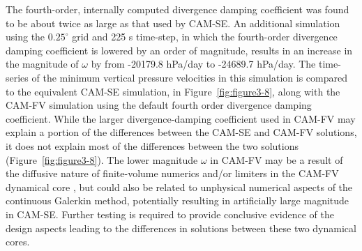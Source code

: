 The fourth-order, internally computed divergence damping coefficient was found to be about twice as large as that used by CAM-SE. An additional simulation using the $0.25^{\circ}$ grid and 225 s time-step, in which the fourth-order divergence damping coefficient is lowered by an order of magnitude, results in an increase in the magnitude of $\omega$ by from -20179.8 hPa/day to -24689.7 hPa/day. The time-series of the minimum vertical pressure velocities in this simulation is compared to the equivalent CAM-SE simulation, in Figure~\ref{fig:figure3-8}, along with the CAM-FV simulation using the default fourth order divergence damping coefficient. While the larger divergence-damping coefficient used in CAM-FV may explain a portion of the differences between the CAM-SE and CAM-FV solutions, it does not explain most of the differences between the two solutions (Figure~\ref{fig:figure3-8}). The lower magnitude $\omega$ in CAM-FV may be a result of the diffusive nature of finite-volume numerics and/or limiters in the CAM-FV dynamical core \citep{LR1997QJR}, but could also be related to unphysical numerical aspects of the continuous Galerkin method, potentially resulting in artificially large magnitude  in CAM-SE. Further testing is required to provide conclusive evidence of the design aspects leading to the differences in solutions between these two dynamical cores.

